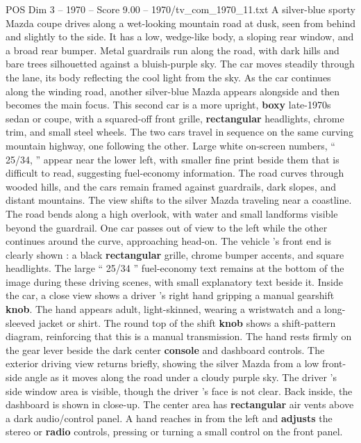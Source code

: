 \begin{textsample}{POS Dim 3 – 1970 – Score 9.00 – 1970/tv\_com\_1970\_11.txt}  \label{ex:f3_pos_033}
A silver-blue sporty Mazda coupe drives along a wet-looking mountain road at dusk, seen from behind and slightly to the side.
It has a low, wedge-like body, a sloping rear window, and a broad rear bumper.
Metal guardrails run along the road, with dark hills and bare trees silhouetted against a bluish-purple sky.
The car moves steadily through the lane, its body reflecting the cool light from the sky.
As the car continues along the winding road, another silver-blue Mazda appears alongside and then becomes the main focus.
This second car is a more upright, \textbf{boxy} late-1970s sedan or coupe, with a squared-off front grille, \textbf{rectangular} headlights, chrome trim, and small steel wheels.
The two cars travel in sequence on the same curving mountain highway, one following the other.
Large white on-screen numbers, “ 25/34, ” appear near the lower left, with smaller fine print beside them that is difficult to read, suggesting fuel-economy information.
The road curves through wooded hills, and the cars remain framed against guardrails, dark slopes, and distant mountains.
The view shifts to the silver Mazda traveling near a coastline.
The road bends along a high overlook, with water and small landforms visible beyond the guardrail.
One car passes out of view to the left while the other continues around the curve, approaching head-on.
The vehicle ’s front end is clearly shown : a black \textbf{rectangular} grille, chrome bumper accents, and square headlights.
The large “ 25/34 ” fuel-economy text remains at the bottom of the image during these driving scenes, with small explanatory text beside it.
Inside the car, a close view shows a driver ’s right hand gripping a manual gearshift \textbf{knob}.
The hand appears adult, light-skinned, wearing a wristwatch and a long-sleeved jacket or shirt.
The round top of the shift \textbf{knob} shows a shift-pattern diagram, reinforcing that this is a manual transmission.
The hand rests firmly on the gear lever beside the dark center \textbf{console} and dashboard controls.
The exterior driving view returns briefly, showing the silver Mazda from a low front-side angle as it moves along the road under a cloudy purple sky.
The driver ’s side window area is visible, though the driver ’s face is not clear.
Back inside, the dashboard is shown in close-up.
The center area has \textbf{rectangular} air vents above a dark audio/control panel.
A hand reaches in from the left and \textbf{adjusts} the stereo or \textbf{radio} controls, pressing or turning a small control on the front panel.

\end{textsample}
